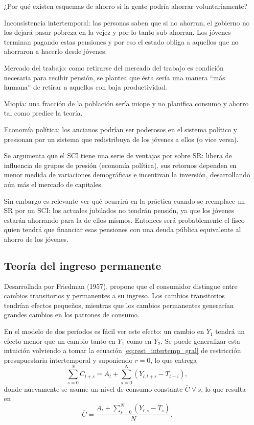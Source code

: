 \documentclass[DeGregorioResumen]{subfiles}
\begin{document}
¿Por qué existen esquemas de ahorro si la gente podría ahorrar voluntariamente?

\begin{enumdescript}
\item [Inconsistencia intertemporal:] las personas saben que si no ahorran, el gobierno no los dejará pasar pobreza en la vejez y por lo tanto sub-ahorran. Los jóvenes terminan pagando estas pensiones y por eso el estado obliga a aquellos que no ahorraron a hacerlo desde jóvenes.
\item [Mercado del trabajo:] como retirarse del mercado del trabajo es condición necesaria para recibir pensión, se plantea que ésta sería una manera ``más humana'' de retirar a aquellos con baja productividad.
\item [Miopía:] una fracción de la población sería miope y no planifica consumo y ahorro tal como predice la teoría.
\item [Economía política:] los ancianos podrían ser poderosos en el sistema político y presionan por un sistema que redistribuya de los jóvenes a ellos (o vice versa).
\end{enumdescript}

Se argumenta que el SCI tiene una serie de ventajas por sobre SR: libera de influencia de grupos de presión (economía política), sus retornos dependen en menor medida de variaciones demográficas e incentivan la inversión, desarrollando aún más el mercado de capitales.

Sin embargo es relevante ver qué ocurrirá en la práctica cuando se reemplace un SR por un SCI:    los actuales jubilados no tendrán pensión, ya que los jóvenes estarán ahorrando para la de ellos mismos. Entonces será probablemente el fisco quien tendrá que financiar esas pensiones con una deuda pública equivalente al ahorro de los jóvenes.

\subsection{Teoría del ingreso permanente}

Desarrollada por Friedman (1957), propone que el consumidor distingue entre cambios transitorios y permanentes a su ingreso. Los cambios transitorios tendrían efectos pequeños, mientras que los cambios permanentes generarían grandes cambios en los patrones de consumo.

En el modelo de dos períodos es fácil ver este efecto: un cambio en $Y_1$ tendrá un efecto menor que un cambio tanto en $Y_1$ como en $Y_2$. Se puede generalizar esta intuición volviendo a tomar la ecuación \eqref{eq:rest_intertemp_gral} de restricción presupuestaria intertemporal y suponiendo $r=0$, lo que entrega
\begin{equation*}
\sum_{s=0}^{N}{C_{t+s}} = A_t + \sum_{s=0}^{N}{(Y_{l,t+s}-T_{t+i})},
\end{equation*}
donde nuevamente se asume un nivel de consumo constante $\overline{C} \; \forall \: s$, lo que resulta en
\begin{equation}
\overline{C}=\frac{A_t+\sum_{s=0}^{N}{(Y_{l,s}-T_s)}}{N}.
\end{equation}
\end{document}

